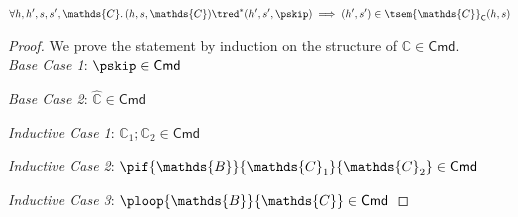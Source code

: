 \begin{lem}
	\begin{gather*}
		\forall h, h', s, s', \mathds{C} \ldotp
		(h, s, \mathds{C}) \tred^* (h', s', \pskip)
		\implies
		(h', s') \in \tsem{\mathds{C}}_\mathsf{C}(h, s)
	\end{gather*}
	{\parindent0pt
	\begin{proof}
	We prove the statement by induction on the structure of $\mathds{C} \in \mathsf{Cmd}$. \\
	
	\textit{Base Case 1}: $\pskip \in \mathsf{Cmd}$
	
	\textit{Base Case 2}: $\hat{\mathds{C}} \in \mathsf{Cmd}$
	
	\textit{Inductive Case 1}: $\mathds{C}_1 ; \mathds{C}_2 \in \mathsf{Cmd}$
	
	\textit{Inductive Case 2}: $\pif{\mathds{B}}{\mathds{C}_1}{\mathds{C}_2} \in \mathsf{Cmd}$
	
	\textit{Inductive Case 3}: $\ploop{\mathds{B}}{\mathds{C}} \in \mathsf{Cmd}$
	\end{proof}
	}
\end{lem}